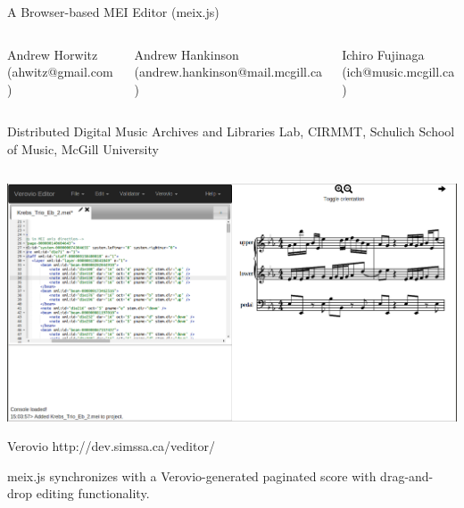 \documentclass[pdf, ignorenonframetext]{beamer}
\begin{document}
\begin{frame}{A Browser-based MEI Editor (meix.js)}
\vspace{0.37cm}
	\begin{columns}
	\scriptsize
		\begin{column}{0.2\textwidth}
	    Andrew Horwitz \\(ahwitz@gmail.com)
	    \end{column}
	    \begin{column}{0.35\textwidth}
	    Andrew Hankinson \\(andrew.hankinson@mail.mcgill.ca)
	    \end{column}
	    \begin{column}{0.2\textwidth}
	    Ichiro Fujinaga \\(ich@music.mcgill.ca)
	    \end{column}
	\end{columns}

	\vspace{\baselineskip}
	\vspace{-0.5cm}
	\tiny
	\begin{center}
	Distributed Digital Music Archives and Libraries Lab, CIRMMT, Schulich School of Music, McGill University
	\end{center}


	\vspace{-1cm}

	\begin{block}{}
		\scriptsize
        \begin{columns}
        \begin{column}{\textwidth}
            \begin{block}{}
                \centering
                \includegraphics[scale=0.15]{mei_editor_verovio}

	            \begin{block}{Verovio}
	    			\vspace{.5\baselineskip}
	                http://dev.simssa.ca/veditor/
	    			\vspace{\baselineskip}

	    			meix.js synchronizes with a Verovio-generated paginated score with drag-and-drop editing functionality.
	            \end{block}
            \end{block}
        \end{column}
        \end{columns}
    \end{block}
\end{frame}
\end{document}
